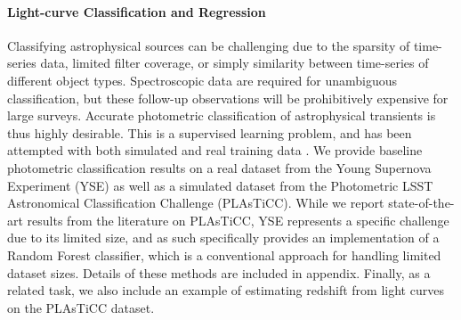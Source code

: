 \documentclass[dvipsnames,table]{article}
\begin{document}
\paragraph{Light-curve Classification and Regression} Classifying astrophysical sources can be challenging due to the sparsity of time-series data, limited filter coverage, or simply similarity between time-series of different object types.
Spectroscopic data are required for unambiguous classification, but these follow-up observations will be prohibitively expensive for large surveys.
Accurate photometric classification of astrophysical transients is thus highly desirable.
This is a supervised learning problem, and has been attempted with both simulated \citep[e.g.][]{kessler2010, lochner2016, moller2016, qu2021, hlozek2023} and real training data \citep[e.g.][]{villar2019, dobryakov2021, burhanudin2021, burhanudin2023, leoni2022}.
We provide baseline photometric classification results on a real dataset from the Young Supernova Experiment (YSE) as well as a simulated dataset from the Photometric LSST Astronomical Classification Challenge (PLAsTiCC). While we report state-of-the-art results from the literature on PLAsTiCC, YSE represents a specific challenge due to its limited size, and as such specifically provides an implementation of a Random Forest classifier, which is a conventional approach for handling limited dataset sizes. Details of these methods are included in appendix. %
Finally, as a related task, we also include an example of estimating redshift from light curves on the PLAsTiCC dataset. %


\end{document}
